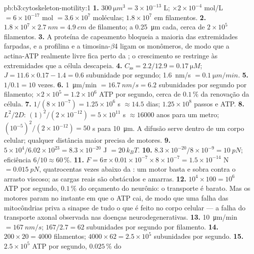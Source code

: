 \begin{solution}{pb:b3:cytoskeleton-motility:1}
\textbf{1.} $\qty{300}{\micro m^3} = 3\times 10^{-13}$ L; $\times
2\times 10^{-4}$ mol/L $= 6\times 10^{-17}$ mol $= 3.6\times 10^{7}$
moléculas; $1.8\times 10^{7}$ em filamentos.
\textbf{2.} $1.8\times 10^{7}\times \qty{2.7}{nm} = \qty{4.9}{cm}$ de
filamento; a \qty{0.25}{\micro m} cada, cerca de $2\times 10^{5}$
filamentos.
\textbf{3.} A proteína de capeamento bloqueia a maioria das
extremidades farpadas, e a profilina e a timosina-$\beta$4 ligam os
monômeros, de modo que a actina-ATP realmente livre fica perto da
; o crescimento se restringe às extremidades que a
célula descapeia.
\textbf{4.} $C_{\text{ss}} = 2.2/12.9 = \qty{0.17}{\micro M}$; $J = 11.6
\times 0.17 - 1.4 = 0.6$ subunidade por segundo; \qty{1.6}{nm/s} $=
\qty{0.1}{\micro m/min}$.
\textbf{5.} $1/0.1 = 10$ vezes.
\textbf{6.} \qty{1}{\micro m/min} $= \qty{16.7}{nm/s} = 6.2$ subunidades
por segundo por filamento; $\times 2\times 10^{5} = 1.2\times 10^{6}$
ATP por segundo, cerca de $0.1\,\%$ da renovação da célula.
\textbf{7.} $1/(8\times 10^{-7}) = 1.25\times 10^{6}$ s $\approx 14.5$
dias; $1.25\times 10^{8}$ passos e ATP.
\textbf{8.} $L^{2}/2D$: $(1)^{2}/(2\times 10^{-12}) = 5\times 10^{11}$ s
$\approx \num{16000}$ anos para um metro; $(10^{-5})^{2}/(2\times
10^{-12}) = 50$ s para \qty{10}{\micro m}. A difusão serve dentro de um
corpo celular; qualquer distância maior precisa de motores.
\textbf{9.} $5\times 10^{4}/6.02\times 10^{23} = 8.3\times 10^{-20}$ J
$= 20\,k_{B}T$.
\textbf{10.} $8.3\times 10^{-20}/8\times 10^{-9} = \qty{10}{pN}$;
eficiência $6/10 \approx 60\,\%$.
\textbf{11.} $F = 6\pi\times 0.01\times 10^{-7}\times 8\times 10^{-7} =
1.5\times 10^{-14}$ N $= \qty{0.015}{pN}$, quatrocentas vezes abaixo da
: um motor basta e sobra contra o arrasto viscoso; as
cargas reais são obstáculos e amarras.
\textbf{12.} $10^{4}\times 100 = 10^{6}$ ATP por segundo, $0.1\,\%$ do
orçamento do neurônio: o transporte é barato. Mas os motores param no
instante em que o ATP cai, de modo que uma falha das mitocôndrias priva
a sinapse de tudo o que é feito no corpo celular --- a falha do
transporte axonal observada nas doenças neurodegenerativas.
\textbf{13.} \qty{10}{\micro m/min} $= \qty{167}{nm/s}$; $167/2.7 = 62$
subunidades por segundo por filamento.
\textbf{14.} $200\times 20 = 4000$ filamentos; $4000\times 62 = 2.5\times
10^{5}$ subunidades por segundo.
\textbf{15.} $2.5\times 10^{5}$ ATP por segundo, $0.025\,\%$ do

\end{solution}

